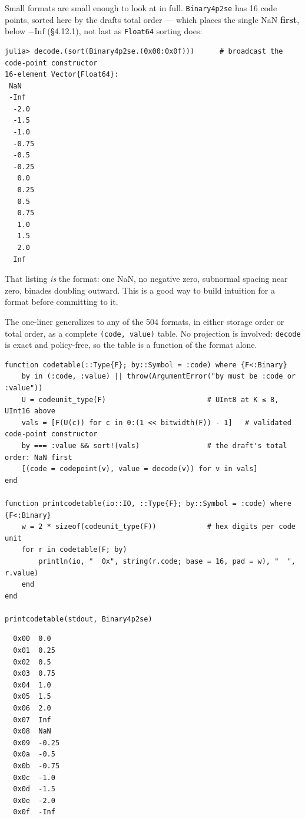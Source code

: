 \label{15296297375297823522}{}


Small formats are small enough to look at in full. \texttt{Binary4p2se} has 16 code points, sorted here by the draft{\textquotesingle}s total order — which places the single NaN \textbf{first}, below −Inf (§4.12.1), not last as \texttt{Float64} sorting does:




\nopagebreak[4]
\begin{verbatim}
julia> decode.(sort(Binary4p2se.(0x00:0x0f)))      # broadcast the code-point constructor
16-element Vector{Float64}:
 NaN
 -Inf
  -2.0
  -1.5
  -1.0
  -0.75
  -0.5
  -0.25
   0.0
   0.25
   0.5
   0.75
   1.0
   1.5
   2.0
  Inf
\end{verbatim}



That listing \emph{is} the format: one NaN, no negative zero, subnormal spacing near zero, binades doubling outward. This is a good way to build intuition for a format before committing to it.



The one-liner generalizes to any of the 504 formats, in either storage order or total order, as a complete \texttt{(code, value)} table. No projection is involved: \texttt{decode} is exact and policy-free, so the table is a function of the format alone.




\begin{minipage}{\linewidth}
\begin{verbatim}
function codetable(::Type{F}; by::Symbol = :code) where {F<:Binary}
    by in (:code, :value) || throw(ArgumentError("by must be :code or :value"))
    U = codeunit_type(F)                        # UInt8 at K ≤ 8, UInt16 above
    vals = [F(U(c)) for c in 0:(1 << bitwidth(F)) - 1]   # validated code-point constructor
    by === :value && sort!(vals)                # the draft's total order: NaN first
    [(code = codepoint(v), value = decode(v)) for v in vals]
end

function printcodetable(io::IO, ::Type{F}; by::Symbol = :code) where {F<:Binary}
    w = 2 * sizeof(codeunit_type(F))            # hex digits per code unit
    for r in codetable(F; by)
        println(io, "  0x", string(r.code; base = 16, pad = w), "  ", r.value)
    end
end

printcodetable(stdout, Binary4p2se)
\end{verbatim}




\begin{verbatim}
  0x00  0.0
  0x01  0.25
  0x02  0.5
  0x03  0.75
  0x04  1.0
  0x05  1.5
  0x06  2.0
  0x07  Inf
  0x08  NaN
  0x09  -0.25
  0x0a  -0.5
  0x0b  -0.75
  0x0c  -1.0
  0x0d  -1.5
  0x0e  -2.0
  0x0f  -Inf
\end{verbatim}
\end{minipage}




